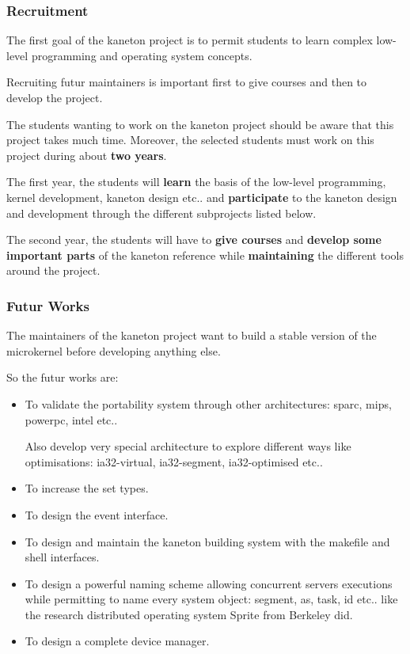 {%

\begin{frame}
  \frametitle{Recruitment}

  The first goal of the kaneton project is to permit students to
  learn complex low-level programming and operating system concepts.

  \nl

  Recruiting futur maintainers is important first to give courses
  and then to develop the project.

  \nl

  The students wanting to work on the kaneton project should be aware
  that this project takes much time. Moreover, the selected students
  must work on this project during about \textbf{two years}.

  \nl

  The first year, the students will \textbf{learn} the basis of the low-level
  programming, kernel development, kaneton design etc.. and
  \textbf{participate} to the kaneton design and development through
  the different subprojects listed below.

  \nl

  The second year, the students will have to \textbf{give courses} and
  \textbf{develop some important parts} of the kaneton reference while
  \textbf{maintaining} the different tools around the project.
\end{frame}


\begin{frame}
  \frametitle{Futur Works}

  The maintainers of the kaneton project want to build a stable version
  of the microkernel before developing anything else.

  \nl

  So the futur works are:

  \begin{itemize}[<+->]
    \item
      To validate the portability system through other architectures:
      sparc, mips, powerpc, intel etc..

      \nl

      Also develop very special architecture to explore different ways
      like optimisations: ia32-virtual, ia32-segment, ia32-optimised etc..
    \item
      To increase the set types.
    \item
      To design the event interface.
    \item
      To design and maintain the kaneton building system with the
      makefile and shell interfaces.
    \item
      To design a powerful naming scheme allowing concurrent
      servers executions while permitting to name every system object:
      segment, as, task, id etc.. like the research distributed operating
      system Sprite from Berkeley did.
    \item
      To design a complete device manager.
  \end{itemize}
\end{frame}

}
